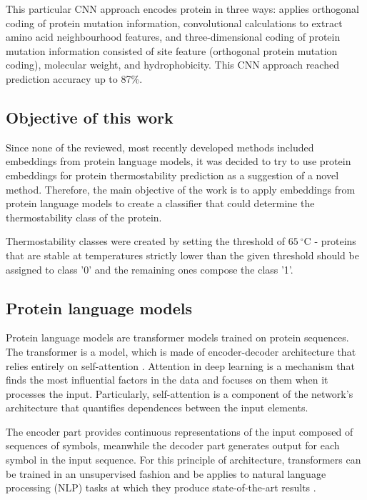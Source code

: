 \documentclass[12pt]{article}
\begin{document}
	This particular CNN approach \cite{fang2019convolution} encodes protein 
	in three ways: applies orthogonal coding of protein mutation information, 
	convolutional calculations to extract amino acid neighbourhood 
	features, and three-dimensional coding of protein mutation information 
	consisted of site feature (orthogonal protein mutation coding), molecular 
	weight, and hydrophobicity. This CNN approach 
	reached prediction accuracy up to 87\%.

	\subsection{Objective of this work}

	Since none of the reviewed, most recently developed methods included 
	embeddings from protein language models, it was decided to try to use 
	protein embeddings for protein thermostability prediction as a 
	suggestion of a novel method. Therefore, the main objective of the 
	work is to apply embeddings from protein language models to create a 
	classifier that could determine the thermostability class of the protein.

	Thermostability classes were created by setting the threshold of 
	$65\ ^\circ$C - proteins that are stable at temperatures strictly lower 
	than the given threshold should be assigned to class '0' and the 
	remaining ones compose the class '1'. 

	\subsection{Protein language models}

	Protein language models are transformer models trained on protein sequences.
	The transformer is a model, which is made of encoder-decoder architecture 
	that relies entirely on self-attention \cite{vaswani2017attention}. 
	Attention in deep learning is a mechanism that finds the most influential
	factors in the data and focuses on them when it processes the input. 
	Particularly, self-attention is a component of the network's architecture
	that quantifies dependences between the input elements.

	The encoder part provides continuous representations of the input composed 
	of sequences of symbols, meanwhile the decoder part generates output for each 
	symbol in the input sequence. For this principle of architecture, transformers
	can be trained in an unsupervised fashion and be applies to natural language
	processing (NLP) tasks at which they produce state-of-the-art 
	results \cite{vig2019analyzing}.
\end{document}
